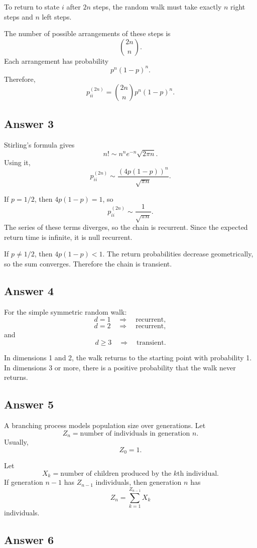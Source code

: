 \documentclass[12pt,a4paper]{article}
\theoremstyle{lecturestyle}
\begin{document}
To return to state $i$ after $2n$ steps, the random walk must take exactly $n$ right steps and $n$ left steps.

The number of possible arrangements of these steps is
\[
\binom{2n}{n}.
\]
Each arrangement has probability
\[
p^n(1-p)^n.
\]
Therefore,
\[
p_{ii}^{(2n)}=\binom{2n}{n}p^n(1-p)^n.
\]

\subsection*{Answer 3}

Stirling's formula gives
\[
n!\sim n^ne^{-n}\sqrt{2\pi n}.
\]
Using it,
\[
p_{ii}^{(2n)}
\sim
\frac{(4p(1-p))^n}{\sqrt{\pi n}}.
\]

If $p=1/2$, then $4p(1-p)=1$, so
\[
p_{ii}^{(2n)}\sim \frac1{\sqrt{\pi n}}.
\]
The series of these terms diverges, so the chain is recurrent. Since the expected return time is infinite, it is null recurrent.

If $p\neq1/2$, then $4p(1-p)<1$. The return probabilities decrease geometrically, so the sum converges. Therefore the chain is transient.

\subsection*{Answer 4}

For the simple symmetric random walk:
\[
d=1 \quad \Rightarrow \quad \text{recurrent},
\]
\[
d=2 \quad \Rightarrow \quad \text{recurrent},
\]
and
\[
d\geq3 \quad \Rightarrow \quad \text{transient}.
\]

In dimensions 1 and 2, the walk returns to the starting point with probability 1. In dimensions 3 or more, there is a positive probability that the walk never returns.

\subsection*{Answer 5}

A branching process models population size over generations. Let
\[
Z_n=\text{number of individuals in generation }n.
\]
Usually,
\[
Z_0=1.
\]

Let
\[
X_k=\text{number of children produced by the }k\text{th individual}.
\]
If generation $n-1$ has $Z_{n-1}$ individuals, then generation $n$ has
\[
Z_n=\sum_{k=1}^{Z_{n-1}}X_k
\]
individuals.

\subsection*{Answer 6}
\end{document}
